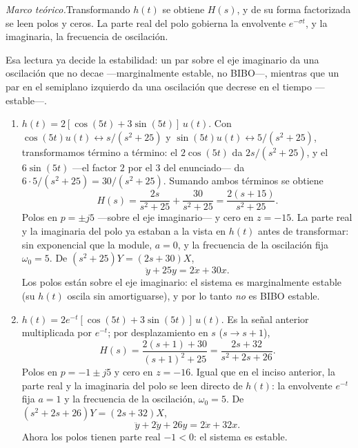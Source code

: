 \documentclass[10pt,a4paper]{article}
\newcommand{\teoria}[1]{\noindent\textit{Marco teórico.}\enspace #1\par\smallskip}
\begin{document}
\teoria{Transformando $h(t)$ se obtiene $H(s)$, y de su forma factorizada se
leen polos y ceros. La parte real del polo gobierna la envolvente
$e^{-\sigma t}$, y la imaginaria, la frecuencia de oscilación.

Esa lectura ya decide la estabilidad: un par sobre el eje imaginario da una
oscilación que no decae ---marginalmente estable, no BIBO---, mientras que un
par en el semiplano izquierdo da una oscilación que decrese en el tiempo ---estable---.}

\begin{enumerate}
	\item $h(t)=2[\cos(5t)+3\sin(5t)]\,u(t)$. Con
	$\cos(5t)u(t)\leftrightarrow s/(s^2+25)$ y
	$\sin(5t)u(t)\leftrightarrow 5/(s^2+25)$, transformamos término a término:
	el $2\cos(5t)$ da $2s/(s^2+25)$, y el $6\sin(5t)$ ---el factor $2$ por el
	$3$ del enunciado--- da $6\cdot 5/(s^2+25)=30/(s^2+25)$. Sumando ambos términos se obtiene
	\[
		H(s)=\frac{2s}{s^2+25}+\frac{30}{s^2+25}=\frac{2(s+15)}{s^2+25}.
	\]
	Polos en $p=\pm j5$ ---sobre el eje imaginario--- y cero en $z=-15$. La
	parte real y la imaginaria del polo ya estaban a la vista en $h(t)$ antes
	de transformar: sin exponencial que la module, $a=0$, y la frecuencia de
	la oscilación fija $\omega_0=5$.
	De $(s^2+25)Y=(2s+30)X$,
	\[
		\ddot y+25y=2\dot x+30x.
	\]
	Los polos están sobre el eje imaginario: el sistema es marginalmente
	estable (su $h(t)$ oscila sin amortiguarse), y por lo tanto \emph{no} es
	BIBO estable.

	\item $h(t)=2e^{-t}[\cos(5t)+3\sin(5t)]\,u(t)$. Es la señal anterior
	multiplicada por $e^{-t}$; por desplazamiento en $s$ ($s\to s+1$),
	\[
		H(s)=\frac{2(s+1)+30}{(s+1)^2+25}=\frac{2s+32}{s^2+2s+26}.
	\]
	Polos en $p=-1\pm j5$ y cero en $z=-16$. Igual que en el inciso anterior,
	la parte real y la imaginaria del polo se leen directo de $h(t)$: la
	envolvente $e^{-t}$ fija $a=1$ y la frecuencia de la oscilación,
	$\omega_0=5$. De
	$(s^2+2s+26)Y=(2s+32)X$,
	\[
		\ddot y+2\dot y+26y=2\dot x+32x.
	\]
	Ahora los polos tienen parte real $-1<0$: el sistema es estable.


\end{enumerate}
\end{document}
